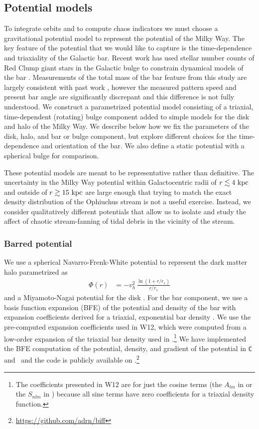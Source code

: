 \subsection{Potential models}\label{sec:potential}
To integrate orbits and to compute chaos indicators we must choose a
gravitational potential model to represent the potential of the Milky Way. The
key feature of the potential that we would like to capture is the
time-dependence and triaxiality of the Galactic bar. Recent work has used
stellar number counts of Red Clump giant stars in the Galactic bulge to
constrain dynamical models of the bar \citep{portail15}. Measurements of the
total mass of the bar feature from this study are largely consistent with past
work \citep[e.g.,][]{wang12}, however the measured pattern speed and present bar
angle are significantly discrepant and this difference is not fully understood.
We construct a parametrized potential model consisting of a triaxial,
time-dependent (rotating) bulge component added to simple models for the disk
and halo of the Milky Way. We describe below how we fix the parameters of the
disk, halo, and bar or bulge component, but explore different choices for the
time-dependence and orientation of the bar. We also define a static potential
with a spherical bulge for comparison.

These potential models are meant to be representative rather than definitive.
The uncertainty in the Milky Way potential within Galactocentric radii of
$r\lesssim 4~{\rm kpc}$ and outside of $r\gtrsim 15~{\rm kpc}$ are large enough
that trying to match the exact density distribution of the Ophiuchus stream is
not a useful exercise. Instead, we consider qualitatively different potentials
that allow us to isolate and study the affect of chaotic stream-fanning of tidal
debris in the vicinity of the stream.

\subsubsection{Barred potential}
We use a spherical Navarro-Frenk-White potential to represent the dark matter
halo \citep{navarro96} parametrized as
\begin{align}
	\Phi(r) &= -v_h^2\,\frac{\ln{(1 + r/r_s)}}{r/r_s}\label{eq:nfw}
\end{align}
and a Miyamoto-Nagai potential for the disk \citep{miyamoto75}. For the bar
component, we use a basis function expansion (BFE) of the potential and density
of the bar with expansion coefficients derived for a triaxial, exponential bar
density \citep[][hereafter W12]{wang12}. We use the pre-computed expansion
coefficients used in W12, which were computed from a low-order expansion of the
triaxial bar density used in \citet{dwek95}.\footnote{The coefficients presented
in W12 are for just the cosine terms (the $A_{lm}$ in \citet{hernquist92} or the
$S_{nlm}$ in \citet{lowing11}) because all sine terms have zero coefficients for
a triaxial density function.} We have implemented the BFE computation of the
potential, density, and gradient of the potential in \texttt{C} and \python\ and
the code is publicly available on
\github.\footnote{\url{https://github.com/adrn/biff}}

